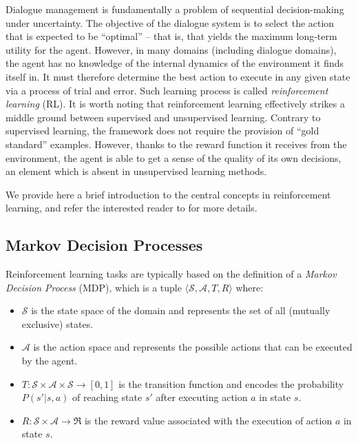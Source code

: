 Dialogue management is fundamentally a problem of sequential decision-making under uncertainty. The objective of the dialogue system is to select the action that is expected to be ``optimal'' -- that is, that yields the maximum long-term utility for the agent. However, in many domains (including dialogue domains), the agent has no knowledge of the internal dynamics of the environment it finds itself in.  It must therefore determine the best action to execute in any given state via a process of trial and error.  Such learning process is called \textit{reinforcement learning} (RL).  It is worth noting that reinforcement learning effectively strikes a middle ground between supervised and unsupervised learning.  Contrary to supervised learning, the framework does not require the provision of ``gold standard'' examples.  However,  thanks to the reward function it receives from the environment, the agent is able to get a sense of the quality of its own decisions, an element which is absent in unsupervised learning methods.  

We provide here a brief introduction to the central concepts in reinforcement learning, and refer the interested reader to \cite{citeulike:112017} for more details. 

\subsection{Markov Decision Processes}
\label{sec:mdp}

Reinforcement learning tasks are typically based on the definition of a \textit{Markov Decision Process} (MDP), which is a tuple $\langle \mathcal{S}, \mathcal{A}, T, R \rangle$ where:
\begin{itemize}
\item $\mathcal{S}$ is the state space of the domain and represents the set of all (mutually exclusive) states.
\item $\mathcal{A}$ is the action space and represents the possible actions that can be executed by the agent.
\item $T: \mathcal{S} \times \mathcal{A} \times \mathcal{S} \rightarrow [0,1]$ is the transition function and encodes the probability $P(s'|s,a)$ of reaching state $s'$ after executing action $a$ in state $s$.
\item $R:  \mathcal{S} \times \mathcal{A} \rightarrow \Re$ is the reward value associated with the execution of action $a$ in state $s$.
\end{itemize}
 
